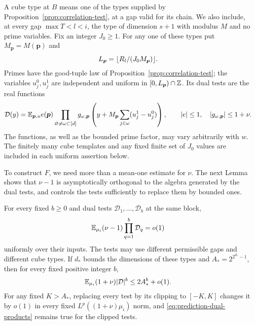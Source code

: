 A cube type at $B$ means one of the types supplied by
Proposition~\ref{prop:correlation-test}, at a gap valid for its chain.  We
also include, at every gap $\max T<l<i$, the type of dimension $s+1$ with
modulus $M$ and no prime variables.  Fix an integer $J_0\geq1$.  For any
one of these types put $M_{\boldsymbol p}=M(\boldsymbol p)$ and
\[
 L_{\boldsymbol p}=\lfloor R_l/(J_0M_{\boldsymbol p})\rfloor.
\]
Primes have the good-tuple law of
Proposition~\ref{prop:correlation-test}; the variables $u_j^0,u_j^1$ are
independent and uniform in $[0,L_{\boldsymbol p})\cap\mathbb Z$.  Its dual tests
are the real functions
\begin{equation}\label{eq:prediction-dual-test}
 \mathcal D(y)=\mathbb E_{\boldsymbol p,u}e(\boldsymbol p)
 \prod_{\varnothing\ne\omega\subset[d]}
 g_{\omega,\boldsymbol p}
 \left(y+M_{\boldsymbol p}\sum_{j\in\omega}(u_j^1-u_j^0)\right),
 \qquad |e|\leq1,\quad |g_{\omega,\boldsymbol p}|\leq1+\nu.
\end{equation}
The functions, as well as the bounded prime factor, may vary arbitrarily
with $w$.  The finitely many cube templates and any fixed finite set of
$J_0$ values are included in each uniform assertion below.

To construct $F$, we need more than a mean-one estimate for $\nu$.
The next Lemma shows that $\nu-1$ is asymptotically orthogonal to the
algebra generated by the dual tests, and controls the tests sufficiently
to replace them by bounded ones.

\begin{lemma}\label{lem:dual-pseudorandomness}
For every fixed $b\geq0$ and dual tests
$\mathcal D_1,\ldots,\mathcal D_b$ at the same block,
\begin{equation}\label{eq:prediction-dual-products}
 \mathbb E_{\mu_i}(\nu-1)\prod_{q=1}^b\mathcal D_q=o(1)
\end{equation}
uniformly over their inputs.  The tests may use different permissible
gaps and different cube types.  If $d_*$ bounds the dimensions of these
types and $A_*=2^{2^{d_*}-1}$, then for every fixed positive integer $b$,
\begin{equation}\label{eq:prediction-dual-moments}
 \mathbb E_{\mu_i}(1+\nu)|\mathcal D|^b\leq2A_*^b+o(1).
\end{equation}
For any fixed $K>A_*$, replacing every test by its clipping to $[-K,K]$
changes it by $o(1)$ in every fixed $L^p((1+\nu)\mu_i)$ norm, and
\eqref{eq:prediction-dual-products} remains true for the clipped tests.
\end{lemma}

